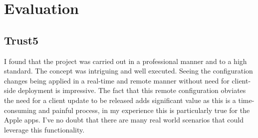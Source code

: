 \section{Evaluation}

\subsection{Trust5}

I found that the project was carried out in a professional manner and to a high standard. The concept was intriguing and well executed. Seeing the configuration changes being applied in a real-time and remote manner without need for client-side deployment is impressive. The fact that this remote configuration obviates the need for a client update to be released adds significant value as this is a time-consuming and painful process, in my experience this is particularly true for the Apple apps. I've no doubt that there are many real world scenarios that could leverage this functionality.
